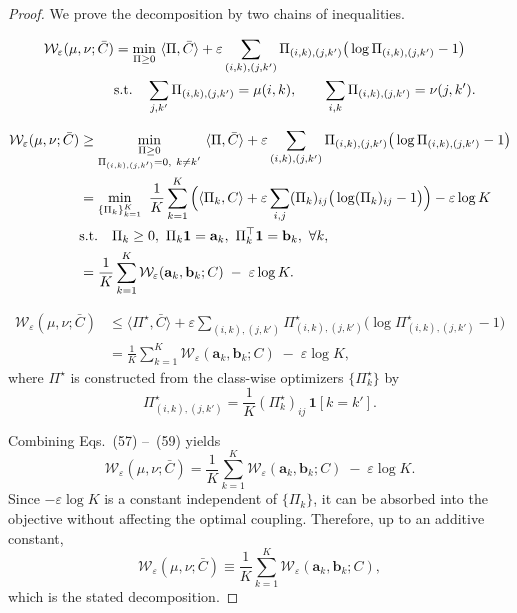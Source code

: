 \documentclass[numsec,webpdf,contemporary,large]{oup-authoring-template}%
\theoremstyle{thmstyleone}%
\theoremstyle{thmstyletwo}%
\theoremstyle{thmstylethree}%
\begin{document}
\begin{proof}
We prove the decomposition by two chains of inequalities.

\begin{align}
\mathcal{W}_{\varepsilon}(\mu,\nu;\bar C)
&=
\min_{\Pi\ge 0}\ \langle \Pi,\bar C\rangle
+\varepsilon\sum_{(i,k),(j,k')} \Pi_{(i,k),(j,k')}\big(\log \Pi_{(i,k),(j,k')}-1\big)
\label{eq:bd0}\\
&\text{s.t.}\quad
\sum_{j,k'} \Pi_{(i,k),(j,k')}=\mu(i,k),\qquad
\sum_{i,k} \Pi_{(i,k),(j,k')}=\nu(j,k').
\notag
\end{align}

\begin{align}
\mathcal{W}_{\varepsilon}(\mu,\nu;\bar C)
&\ge
\min_{\substack{\Pi\ge 0\\ \Pi_{(i,k),(j,k')}=0,\ k\neq k'}}\ 
\langle \Pi,\bar C\rangle
+\varepsilon\sum_{(i,k),(j,k')} \Pi_{(i,k),(j,k')}\big(\log \Pi_{(i,k),(j,k')}-1\big)
\label{eq:bd1}\\
&=
\min_{\{\Pi_k\}_{k=1}^{K}}\ 
\frac{1}{K}\sum_{k=1}^{K}
\Big(
\langle \Pi_k,C\rangle
+\varepsilon\sum_{i,j}(\Pi_k)_{ij}\big(\log (\Pi_k)_{ij}-1\big)
\Big)
-\varepsilon\log K
\label{eq:bd2}\\
&\text{s.t.}\quad
\Pi_k\ge 0,\ \Pi_k\mathbf{1}=\mathbf{a}_k,\ \Pi_k^\top\mathbf{1}=\mathbf{b}_k,\ \forall k,
\notag\\
&=
\frac{1}{K}\sum_{k=1}^{K}\mathcal{W}_{\varepsilon}(\mathbf{a}_k,\mathbf{b}_k;C)\;-\;\varepsilon\log K.
\label{eq:bd3}
\end{align}

\begin{align}
\mathcal{W}_{\varepsilon}(\mu,\nu;\bar C)
&\le
\langle \Pi^\star,\bar C\rangle
+\varepsilon\sum_{(i,k),(j,k')} \Pi^\star_{(i,k),(j,k')}\big(\log \Pi^\star_{(i,k),(j,k')}-1\big)
\label{eq:bd4}\\
&=
\frac{1}{K}\sum_{k=1}^{K}\mathcal{W}_{\varepsilon}(\mathbf{a}_k,\mathbf{b}_k;C)\;-\;\varepsilon\log K,
\label{eq:bd5}
\end{align}
where $\Pi^\star$ is constructed from the class-wise optimizers $\{\Pi_k^\star\}$ by
\[
\Pi^\star_{(i,k),(j,k')}=\frac{1}{K}(\Pi_k^\star)_{ij}\,\mathbf{1}[k=k'].
\]

Combining Eqs.~(57) --~(59) yields
\begin{equation} 
\mathcal{W}_{\varepsilon}(\mu,\nu;\bar C)
=
\frac{1}{K}\sum_{k=1}^{K}\mathcal{W}_{\varepsilon}(\mathbf{a}_k,\mathbf{b}_k;C)\;-\;\varepsilon\log K.
\end{equation}
Since $-\varepsilon\log K$ is a constant independent of $\{\Pi_k\}$, it can be absorbed into the objective without affecting the optimal coupling. Therefore, up to an additive constant,
\begin{equation}
\mathcal{W}_{\varepsilon}(\mu,\nu;\bar C)
\equiv
\frac{1}{K}\sum_{k=1}^{K}\mathcal{W}_{\varepsilon}(\mathbf{a}_k,\mathbf{b}_k;C),
\end{equation}
which is the stated decomposition.
\end{proof}
\end{document}
